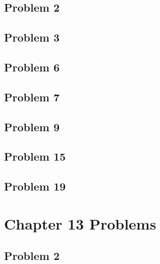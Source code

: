\documentclass[10pt]{mypackage}
\begin{document}
\subsection{Problem 2}%
\subsection{Problem 3}%
\subsection{Problem 6}%
\subsection{Problem 7}%
\subsection{Problem 9}%
\subsection{Problem 15}%
\subsection{Problem 19}%

\section{Chapter 13 Problems}%
\subsection{Problem 2}%
\end{document}
